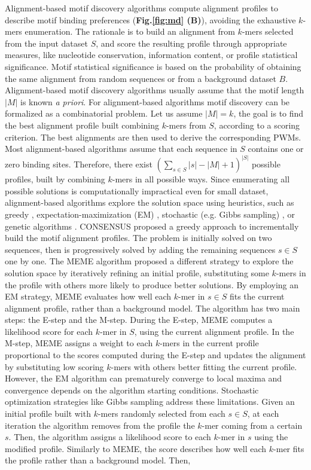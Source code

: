 \documentclass[a4paper, titlepage, openright]{book}
\begin{document}
Alignment-based motif discovery algorithms compute alignment profiles to describe motif binding preferences (\textbf{Fig.\ref{fig:md} (B)}), avoiding the exhaustive $k$-mers enumeration. The rationale is to build an alignment from $k$-mers selected from the input dataset $S$, and score the resulting profile through appropriate measures, like nucleotide conservation, information content, or profile statistical significance. Motif statistical significance is based on the probability of obtaining the same alignment from random sequences or from a background dataset $B$. Alignment-based motif discovery algorithms usually assume that the motif length $|M|$ is known \emph{a priori}. For alignment-based algorithms motif discovery can be formalized as a combinatorial problem. Let us assume $|M|=k$, the goal is to find the best alignment profile built combining $k$-mers from $S$, according to a scoring criterion. The best alignments are then used to derive the corresponding PWMs. Most alignment-based algorithms assume that each sequence in $S$ contains one or zero binding sites. Therefore, there exist $(\sum_{s \in S}{|s|} - |M| + 1)^{|S|}$  possible profiles, built by combining $k$-mers in all possible ways. Since enumerating all possible solutions is computationally impractical even for small dataset, alignment-based algorithms explore the solution space using heuristics, such as greedy \citep{hertz1999identifying}, expectation-maximization (EM) \citep{bailey1994fitting}, stochastic (e.g. Gibbs sampling) \citep{lawrence1993detecting}, or genetic algorithms \citep{lee2018comprehensive}. CONSENSUS \citep{hertz1999identifying} proposed a greedy approach to incrementally build the motif alignment profiles. The problem is initially solved on two sequences, then is progressively solved by adding the remaining sequences $s \in S$ one by one. The MEME algorithm \citep{bailey1994fitting,bailey1995value,bailey2006meme} proposed a different strategy to explore the solution space by iteratively refining an initial profile, substituting some $k$-mers in the profile with others more likely to produce better solutions. By employing an EM strategy, MEME evaluates how well each $k$-mer in $s \in S$ fits the current alignment profile, rather than a background model. The algorithm has two main steps: the E-step and the M-step. During the E-step, MEME computes a likelihood score for each $k$-mer in $S$, using the current alignment profile. In the M-step, MEME assigns a weight to each $k$-mers in the current profile proportional to the scores computed during the E-step and updates the alignment by substituting low scoring $k$-mers with others better fitting the current profile. However, the EM algorithm can prematurely converge to local maxima and convergence depends on the algorithm starting conditions. Stochastic optimization strategies like Gibbs sampling \citep{lawrence1990expectation} address these limitations. Given an initial profile built with $k$-mers randomly selected from each $s \in S$, at each iteration the algorithm removes from the profile the $k$-mer coming from a certain $s$. Then, the algorithm assigns a likelihood score to each $k$-mer in $s$ using the modified profile. Similarly to MEME, the score describes how well each $k$-mer fits the profile rather than a background model. Then, 
\end{document}
